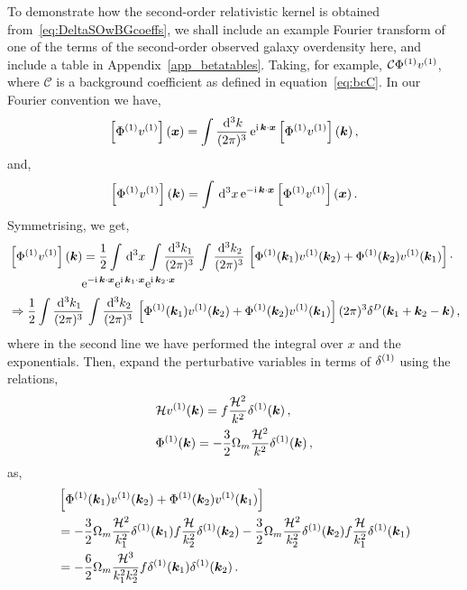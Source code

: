 To demonstrate how the second-order relativistic kernel is obtained from~\eqref{eq:DeltaSOwBGcoeffs}, we shall include an example Fourier transform of one of the terms of the second-order observed galaxy overdensity here, and include a table in Appendix~\ref{app_betatables}.
Taking, for example, $\mathcal{C} \Phi^{(1)} v^{(1)}$, where $\mathcal{C}$ is a background coefficient as defined in equation~\eqref{eq:bcC}. In our Fourier convention we have, 
\begin{equation}
	\left[ \Phi^{(1)} v^{(1)} \right](\bm {x}) = \int \frac{\,\mathrm{d}^3 k}{(2\pi)^3}\, \mathrm{e}^{\mathrm{i\,} \bm {k}\cdot\bm {x}} \left[ \Phi^{(1)} v^{(1)} \right] (\bm {k})\,,
\end{equation}
and, 
\begin{equation}
	\left[ \Phi^{(1)} v^{(1)} \right](\bm {k}) = \int \,\mathrm{d}^3 x\, \mathrm{e}^{- \mathrm{i\,} \bm {k}\cdot\bm {x}} \left[ \Phi^{(1)} v^{(1)} \right](\bm {x})\,.
\end{equation}
Symmetrising, we get, 
\begin{align}
	&\left[ \Phi^{(1)} v^{(1)} \right](\bm {k}) = \frac{1}{2} \int \,\mathrm{d}^3 x\, \int \frac{\,\mathrm{d}^3 k_1}{(2 \pi)^3}\, \int \frac{\,\mathrm{d}^3 k_2}{(2\pi)^3}\, \left[ \Phi^{(1)}(\bm {k}_1) v^{(1)}(\bm {k}_2) + \Phi^{(1)}(\bm {k}_2) v^{(1)}(\bm {k}_1) \right] \cdot \nonumber \\
	& \qquad\qquad\qquad \mathrm{e}^{-\mathrm{i\,} \bm {k}\cdot\bm {x}} \mathrm{e}^{\mathrm{i\,} \bm {k}_1\cdot\bm {x}} \mathrm{e}^{\mathrm{i\,} \bm {k}_2\cdot\bm {x}} \\
	&\Rightarrow \frac{1}{2} \int\frac{\,\mathrm{d}^3 k_1}{(2\pi)^3}\,\int \frac{\,\mathrm{d}^3 k_2}{(2\pi)^3}\, \left[ \Phi^{(1)}(\bm {k}_1) v^{(1)}(\bm {k}_2) + \Phi^{(1)}(\bm {k}_2) v^{(1)}(\bm {k}_1)\right] (2\pi)^3 \delta^D(\bm {k}_1+\bm {k}_2-\bm {k})\,,
\end{align}
where in the second line we have performed the integral over $x$ and the exponentials. Then, expand the perturbative variables in terms of $\delta^{(1)}$ using the relations,
\begin{align}
	&\mathcal{H} v^{(1)}(\bm {k}) = f \frac{\mathcal{H}^2}{k^2} \delta^{(1)}(\bm {k})\,,\\
	&\Phi^{(1)}(\bm {k}) = - \frac{3}{2} \Omega_m \frac{\mathcal{H}^2}{k^2} \delta^{(1)}(\bm {k})\,,
\end{align}
as, 
\begin{align}
	&\left[ \Phi^{(1)}(\bm {k}_1) v^{(1)}(\bm {k}_2) + \Phi^{(1)}(\bm {k}_2) v^{(1)}(\bm {k}_1) \right]\\
	&= - \frac{3}{2} \Omega_m \frac{\mathcal{H}^2}{k_1^2} \delta^{(1)}(\bm {k}_1) f \frac{\mathcal{H}}{k_2^2} \delta^{(1)}(\bm {k}_2) - \frac{3}{2} \Omega_m \frac{\mathcal{H}^2}{k_2^2} \delta^{(1)}(\bm {k}_2) f \frac{\mathcal{H}}{k_1^2} \delta^{(1)}(\bm {k}_1)\\
	&= - \frac{6}{2} \Omega_m \frac{\mathcal{H}^3}{k_1^2 k_2^2} f \delta^{(1)}(\bm {k}_1) \delta^{(1)}(\bm {k}_2)\,.
\end{align}
